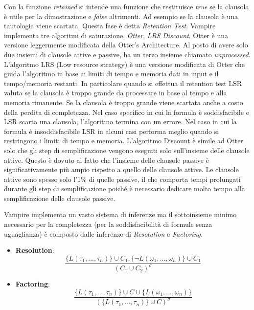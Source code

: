 \documentclass[./main.tex]{subfiles}
\begin{document}
Con la funzione \textit{retained} si intende una funzione che restituisce \textit{true} se la clausola 
è utile per la dimostrazione e \textit{false} altrimenti. 
Ad esempio se la clausola è una tautologia viene scartata.
Questa fase è detta \textit{Retention Test}.
Vampire implementa tre algoritmi di saturazione, \textit{Otter}, \textit{LRS} \textit{Discount}.
Otter è una versione leggermente modificata della Otter's Architecture. Al posto di avere solo due insiemi di clausole attive e passive,
ha un terzo insieme chiamato \textit{unprocessed}. 
L'algoritmo LRS (Low resource strategy) è una versione modificata di Otter che guida l'algoritmo in base ai limiti di tempo e memoria dati in input 
e il tempo/memoria restanti. 
In particolare quando si effettua il retention test LSR valuta se la clausola è troppo grande da processare in base al tempo e alla memoria rimanente.
Se la clausola è troppo grande viene scartata anche a costo della perdita di completezza.
Nel caso specifico in cui la formula è soddisfacibile e LSR scarta una clausola, l'algoritmo termina con un errore.
Nel caso in cui la formula è insoddisfacibile LSR in alcuni casi performa meglio quando si restringono i limiti di tempo e memoria.
L'algoritmo Discount è simile ad Otter solo che gli step di semplificazione vengono eseguiti solo sull'insieme delle clausole attive.
Questo è dovuto al fatto che l'insieme delle clausole passive è significativamente più ampio rispetto a quello delle clausole attive. 
Le clausole attive sono spesso solo l'1\% di quelle passive, il che comporta tempi prolungati durante gli step di semplificazione 
poiché è necessario dedicare molto tempo alla semplificazione delle clausole passive.

Vampire implementa un vasto sistema di inferenze ma il sottoinsieme minimo necessario per la completezza (per la soddisfacibilità di formule senza uguaglianza) è composto 
dalle inferenze di \textit{Resolution} e \textit{Factoring}.

\begin{itemize}
    \item[]\textbf{Resolution}: 
    $$ \frac{\{L(\tau_1, ..., \tau_n)\} \cup C_1, \{\lnot L(\omega_1, ..., \omega_n)\} \cup C_1}{(C_1 \cup C_2)^\sigma} $$
    \item[]\textbf{Factoring}: 
    $$ \frac{\{L(\tau_1, ..., \tau_n)\} \cup C \cup \{L(\omega_1, ..., \omega_n)\}}{(\{L(\tau_1, ..., \tau_n)\} \cup C)^\sigma} $$
\end{itemize}
\end{document}
